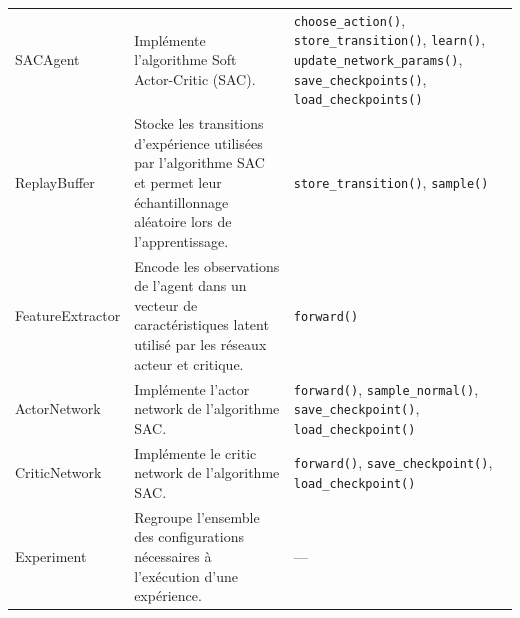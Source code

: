 \begin{longtable}{
        >{\ttfamily\small}p{}
        p{}
        >{\ttfamily\small}p{}
    }
    SACAgent
                                 & Implémente l'algorithme Soft Actor-Critic (SAC).                                                                                                                               & \texttt{choose\_action()}, \texttt{store\_transition()}, \texttt{learn()}, \texttt{update\_network\_params()}, \texttt{save\_checkpoints()}, \texttt{load\_checkpoints()}              \\

    ReplayBuffer
                                 & Stocke les transitions d'expérience utilisées par l'algorithme SAC et permet leur échantillonnage aléatoire lors de l'apprentissage.                                           & \texttt{store\_transition()}, \texttt{sample()}                                                                                                                                        \\

    FeatureExtractor
                                 & Encode les observations de l'agent dans un vecteur de caractéristiques latent utilisé par les réseaux acteur et critique.                                                      & \texttt{forward()}                                                                                                                                                                     \\

    ActorNetwork
                                 & Implémente l'actor network de l'algorithme SAC.                                                                                                                                & \texttt{forward()}, \texttt{sample\_normal()}, \texttt{save\_checkpoint()}, \texttt{load\_checkpoint()}                                                                                \\

    CriticNetwork
                                 & Implémente le critic network de l'algorithme SAC.                                                                                                                              & \texttt{forward()}, \texttt{save\_checkpoint()}, \texttt{load\_checkpoint()}                                                                                                           \\

    Experiment
                                 & Regroupe l'ensemble des configurations nécessaires à l'exécution d'une expérience.                                                                                             & ---
    \\


\end{longtable}
